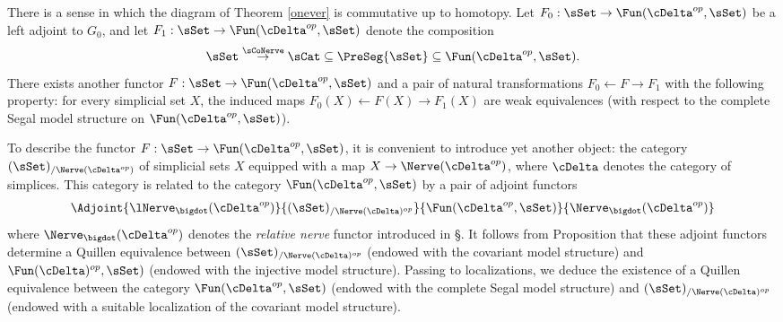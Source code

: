 \begin{remark}\label{spade}
There is a sense in which the diagram of Theorem \ref{onever} is commutative up to homotopy. Let $F_0: \sSet \rightarrow \Fun( \cDelta^{op}, \sSet)$ be a left
adjoint to $G_0$, and let $F_1: \sSet \rightarrow \Fun( \cDelta^{op}, \sSet)$ denote the composition
$$ \sSet \stackrel{ \sCoNerve}{\rightarrow} \sCat \subseteq \PreSeg{\sSet}
\subseteq \Fun( \cDelta^{op}, \sSet).$$
There exists another functor $F: \sSet \rightarrow \Fun( \cDelta^{op}, \sSet)$
and a pair of natural transformations $F_0 \leftarrow F \rightarrow F_1$ with the following
property: for every simplicial set $X$, the induced maps $F_0(X) \leftarrow F(X) \rightarrow F_1(X)$
are weak equivalences (with respect to the complete Segal model structure on
$\Fun( \cDelta^{op}, \sSet)$). 

To describe the functor $F: \sSet \rightarrow \Fun( \cDelta^{op}, \sSet)$, 
it is convenient to introduce yet another object:
the category $(\sSet)_{/ \Nerve( \cDelta^{op})}$ of simplicial sets $X$ equipped with
a map $X \rightarrow \Nerve( \cDelta^{op})$, where $\cDelta$ denotes the category
of simplices. This category is related to the category $\Fun( \cDelta^{op}, \sSet)$
by a pair of adjoint functors
$$ \Adjoint{ \lNerve_{\bigdot}( \cDelta^{op} ) }{ (\sSet)_{/ \Nerve(\cDelta)^{op} }}{\Fun( \cDelta^{op}, \sSet)}{\Nerve_{\bigdot}( \cDelta^{op} )}$$
where $\Nerve_{\bigdot}(\cDelta^{op})$ denotes the {\it relative nerve} functor
introduced in \S {}. It follows from Proposition  that these adjoint
functors determine a Quillen equivalence between $(\sSet)_{/ \Nerve(\cDelta)^{op} }$
(endowed with the covariant model structure) and $\Fun( \cDelta)^{op}, \sSet)$ 
(endowed with the injective model structure). Passing to localizations, we
deduce the existence of a Quillen equivalence between the category
$\Fun( \cDelta^{op}, \sSet)$ (endowed with the complete Segal model structure)
and $(\sSet)_{/ \Nerve(\cDelta)^{op}}$ (endowed with a suitable localization
of the covariant model structure).


\end{remark}
